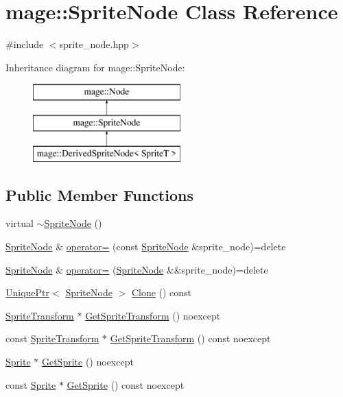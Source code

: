 \hypertarget{classmage_1_1_sprite_node}{}\section{mage\+:\+:Sprite\+Node Class Reference}
\label{classmage_1_1_sprite_node}


{\ttfamily \#include $<$sprite\+\_\+node.\+hpp$>$}

Inheritance diagram for mage\+:\+:Sprite\+Node\+:\begin{figure}[H]
\begin{center}
\leavevmode
\includegraphics[height=3.000000cm]{classmage_1_1_sprite_node}
\end{center}
\end{figure}
\subsection*{Public Member Functions}
\begin{DoxyCompactItemize}
\item 
virtual \hyperlink{classmage_1_1_sprite_node_a04ada795f035b935af9992a6b7a75959}{$\sim$\+Sprite\+Node} ()
\item 
\hyperlink{classmage_1_1_sprite_node}{Sprite\+Node} \& \hyperlink{classmage_1_1_sprite_node_a009228c9f53671a4275534ceb7733bd0}{operator=} (const \hyperlink{classmage_1_1_sprite_node}{Sprite\+Node} \&sprite\+\_\+node)=delete
\item 
\hyperlink{classmage_1_1_sprite_node}{Sprite\+Node} \& \hyperlink{classmage_1_1_sprite_node_a908ba50d10d6573e913a8c2d785c7d69}{operator=} (\hyperlink{classmage_1_1_sprite_node}{Sprite\+Node} \&\&sprite\+\_\+node)=delete
\item 
\hyperlink{namespacemage_a3316d7143a973e37adf1110f2e80ca31}{Unique\+Ptr}$<$ \hyperlink{classmage_1_1_sprite_node}{Sprite\+Node} $>$ \hyperlink{classmage_1_1_sprite_node_a16481829a3796abd5afe5ce0c9ebf578}{Clone} () const
\item 
\hyperlink{classmage_1_1_sprite_transform}{Sprite\+Transform} $\ast$ \hyperlink{classmage_1_1_sprite_node_a99d90a2a337a45c0623022756c53f214}{Get\+Sprite\+Transform} () noexcept
\item 
const \hyperlink{classmage_1_1_sprite_transform}{Sprite\+Transform} $\ast$ \hyperlink{classmage_1_1_sprite_node_a021d8d7d51a05330bfa6d034482988a0}{Get\+Sprite\+Transform} () const noexcept
\item 
\hyperlink{classmage_1_1_sprite}{Sprite} $\ast$ \hyperlink{classmage_1_1_sprite_node_a84806dd38c94900f0fabf0163a706370}{Get\+Sprite} () noexcept
\item 
const \hyperlink{classmage_1_1_sprite}{Sprite} $\ast$ \hyperlink{classmage_1_1_sprite_node_a585276a679d83576464014eeb156cf10}{Get\+Sprite} () const noexcept
\end{DoxyCompactItemize}
